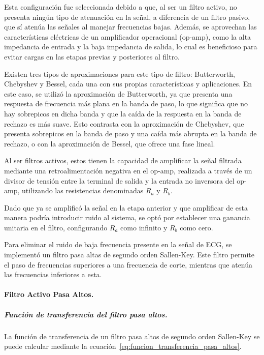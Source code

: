             Esta configuración fue seleccionada debido a que, al ser un filtro activo, no presenta ningún tipo de atenuación en la señal, a diferencia de un filtro pasivo, que sí atenúa las señales al manejar frecuencias bajas. Además, se aprovechan las características eléctricas de un amplificador operacional (op-amp), como la alta impedancia de entrada y la baja impedancia de salida, lo cual es beneficioso para evitar cargas en las etapas previas y posteriores al filtro.
        
            Existen tres tipos de aproximaciones para este tipo de filtro: Butterworth, Chebyshev y Bessel, cada una con sus propias características y aplicaciones. En este caso, se utilizó la aproximación de Butterworth, ya que presenta una respuesta de frecuencia más plana en la banda de paso, lo que significa que no hay sobrepicos en dicha banda y que la caída de la respuesta en la banda de rechazo es más suave. Esto contrasta con la aproximación de Chebyshev, que presenta sobrepicos en la banda de paso y una caída más abrupta en la banda de rechazo, o con la aproximación de Bessel, que ofrece una fase lineal.

            Al ser filtros activos, estos tienen la capacidad de amplificar la señal filtrada mediante una retroalimentación negativa en el op-amp, realizada a través de un divisor de tensión entre la terminal de salida y la entrada no inversora del op-amp, utilizando las resistencias denominadas $R_a$ y $R_b$.

            Dado que ya se amplificó la señal en la etapa anterior y que amplificar de esta manera podría introducir ruido al sistema, se optó por establecer una ganancia unitaria en el filtro, configurando $R_a$ como infinito y $R_b$ como cero.

            Para eliminar el ruido de baja frecuencia presente en la señal de ECG, se implementó un filtro pasa altas de segundo orden Sallen-Key. Este filtro permite el paso de frecuencias superiores a una frecuencia de corte, mientras que atenúa las frecuencias inferiores a esta.

            \paragraph{Filtro Activo Pasa Altos.}
                \subparagraph{Función de transferencia del filtro pasa altos.}
                    La función de transferencia de un filtro pasa altos de segundo orden Sallen-Key se puede calcular mediante la ecuación~\ref{eq:funcion_transferencia_pasa_altos}.

